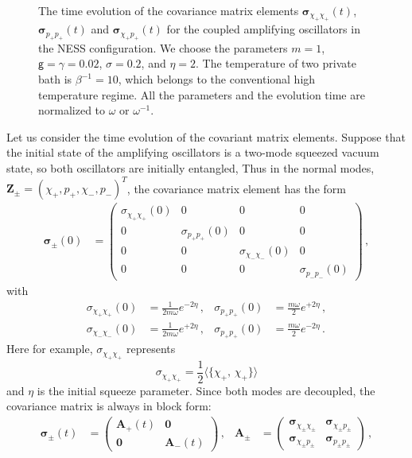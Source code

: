 \documentclass[11pt,a4paper]{article}
\begin{document}
\begin{figure}
\centering
    \caption{The time evolution of the covariance matrix elements $\bm{\sigma}_{\chi_{+}\chi_{+}}(t)$, $\bm{\sigma}_{p_{+}p_{+}}(t)$ and $\bm{\sigma}_{\chi_{+}p_{+}}(t)$ for the coupled amplifying oscillators in the NESS configuration. We choose the parameters $m=1$, $\mathsf{g}=\gamma=0.02$, $\sigma=0.2$, and $\eta=2$. The temperature of two private bath is $\beta^{-1}=10$, which belongs to the conventional high temperature regime. All the parameters and the evolution time are normalized to $\omega$ or $\omega^{-1}$.}\label{Fi:AO_ppMode}
\end{figure}
Let us consider the time evolution of the covariant matrix elements. Suppose that the initial state of the amplifying oscillators is a two-mode squeezed vacuum state, so both oscillators are initially entangled, Thus in the normal modes, $\bm{Z}_{\pm}=(\chi_{+}, p_{+}, \chi_{-}, p_{-})^{T}$, the covariance matrix element has the form
\begin{align*}
	\bm{\sigma}_{\pm}(0)&=\begin{pmatrix}\sigma_{\chi_{+}\chi_{+}}(0) &0 &0 &0 \\[4pt]0 &\sigma_{p_{+}p_{+}}(0) &0 &0\\[4pt]0 &0 &\sigma_{\chi_{-}\chi_{-}}(0) &0\\[4pt] 0 &0 &0 &\sigma_{p_{-}p_{-}}(0) \end{pmatrix}\,,
\end{align*}
with 
\begin{align*}
	\sigma_{\chi_{+}\chi_{+}}(0)&=\frac{1}{2m\omega}e^{-2\eta}\,,&\sigma_{p_{+}p_{+}}(0)&=\frac{m\omega}{2}e^{+2\eta}\,,\\
	\sigma_{\chi_{-}\chi_{-}}(0)&=\frac{1}{2m\omega}e^{+2\eta}\,,&\sigma_{p_{+}p_{+}}(0)&=\frac{m\omega}{2}e^{-2\eta}\,.
\end{align*}
Here for example, $\sigma_{\chi_{+}\chi_{+}}$ represents
\begin{equation}
	\sigma_{\chi_{+}\chi_{+}}=\frac{1}{2}\langle\{\chi_{+},\,\chi_{+}\}\rangle
\end{equation}
and $\eta$ is the {initial} squeeze parameter. Since both modes are decoupled, the covariance matrix is always in block form:
\begin{align}\label{E:pworihfbd}   
    \bm{\sigma}_{\pm}(t)&=\begin{pmatrix}\bm{A}_+(t) &\bm{0}\\\bm{0} &\bm{A}_-(t)\end{pmatrix}\,,&\bm{A}_{\pm}&=\begin{pmatrix}
        \bm{\sigma}_{\chi_{\pm}\chi_{\pm}} &\bm{\sigma}_{\chi_{\pm}p_{\pm}}\\\bm{\sigma}_{\chi_{\pm}p_{\pm}} &\bm{\sigma}_{p_{\pm}p_{\pm}}
    \end{pmatrix}\,,
\end{align}
\end{document}

